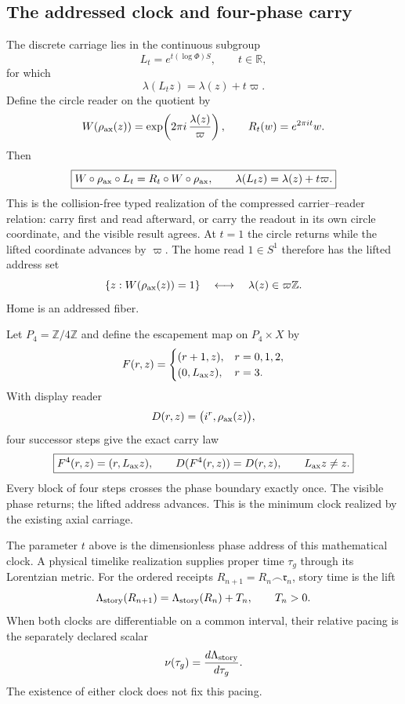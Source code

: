 \documentclass[10pt]{article}
\newcommand{\R}{\mathbb R}
\newcommand{\Z}{\mathbb Z}
\begin{document}
\subsection*{The addressed clock and four-phase carry}
The discrete carriage lies in the continuous subgroup
\[
L_t=e^{t(\log\Phi)S},\qquad t\in\R,
\]
for which
\[
\lambda(L_tz)=\lambda(z)+t\varpi.
\]
Define the circle reader on the quotient by
\[
W(\rho_{\rm ax}(z))
=\exp\!\left(2\pi i\,\frac{\lambda(z)}{\varpi}\right),
\qquad
R_t(w)=e^{2\pi it}w.
\]
Then
\begin{equation}
\boxed{W\circ\rho_{\rm ax}\circ L_t
=R_t\circ W\circ\rho_{\rm ax},\qquad
\lambda(L_tz)=\lambda(z)+t\varpi.}
\label{eq:clockintertwiner}
\end{equation}
This is the collision-free typed realization of the compressed
carrier--reader relation: carry first and read afterward, or carry the
readout in its own circle coordinate, and the visible result agrees. At
$t=1$ the circle returns while the lifted coordinate advances by
$\varpi$. The home read $1\in S^1$ therefore has the lifted address set
\[
\{z:W(\rho_{\rm ax}(z))=1\}
\quad\longleftrightarrow\quad
\lambda(z)\in\varpi\Z .
\]
Home is an addressed fiber.

Let $P_4=\Z/4\Z$ and define the escapement map on $P_4\times X$ by
\[
F(r,z)=
\begin{cases}
(r+1,z),&r=0,1,2,\\
(0,L_{\rm ax}z),&r=3.
\end{cases}
\]
With display reader
\[
D(r,z)=\bigl(i^r,\rho_{\rm ax}(z)\bigr),
\]
four successor steps give the exact carry law
\begin{equation}
\boxed{F^4(r,z)=(r,L_{\rm ax}z),\qquad
D(F^4(r,z))=D(r,z),\qquad L_{\rm ax}z\ne z.}
\label{eq:fourphasecarry}
\end{equation}
Every block of four steps crosses the phase boundary exactly once.
The visible phase returns; the lifted address advances. This is the
minimum clock realized by the existing axial carriage.

The parameter $t$ above is the dimensionless phase address of this
mathematical clock. A physical timelike realization supplies proper time
$\tau_g$ through its Lorentzian metric. For the ordered receipts
$R_{n+1}=R_n\frown\mathfrak r_n$, story time is the lift
\[
\Lambda_{\rm story}(R_{n+1})
=\Lambda_{\rm story}(R_n)+T_n,\qquad T_n>0.
\]
When both clocks are differentiable on a common interval, their relative
pacing is the separately declared scalar
\[
\nu(\tau_g)=\frac{d\Lambda_{\rm story}}{d\tau_g}.
\]
The existence of either clock does not fix this pacing.
\end{document}
